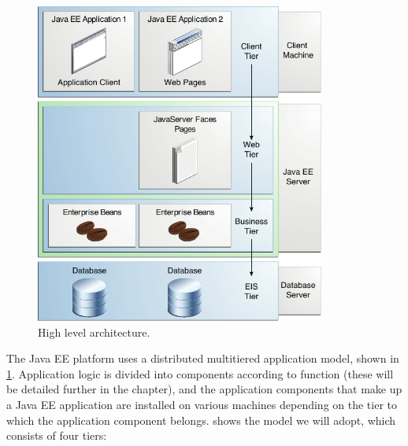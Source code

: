 \begin{figure}
	\centering
	\includegraphics[width=0.85\textwidth]{img/JEETT}
	\caption{High level architecture.}
	\label{fig:jeett}
\end{figure}

The Java EE platform uses a distributed multitiered application model, shown in \cref{fig:jeett}. Application logic is divided into components according to function (these will be detailed further in the chapter), and the application components that make up a Java EE application are installed on various machines depending on the tier to which the application component belongs.  shows the model we will adopt, which consists of four tiers:

